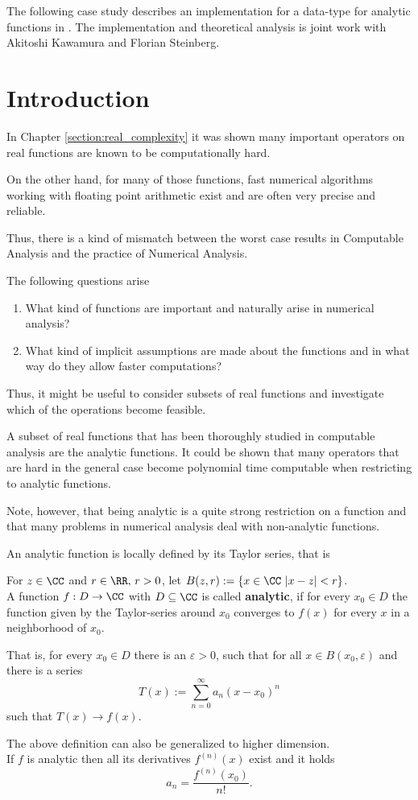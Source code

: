  The following case study describes an implementation for a data-type for
  analytic functions in \irram.
  The implementation and theoretical analysis is joint work with Akitoshi Kawamura and Florian
  Steinberg.
	\section{Introduction}
		In Chapter \ref{section:real_complexity} it was shown many important operators 
		on real functions are known to be computationally hard.

		On the other hand, for many of those functions, fast numerical algorithms working with 
    floating point arithmetic exist and are often very precise and reliable.

    Thus, there is a kind of mismatch between the worst case results in Computable Analysis
    and the practice of Numerical Analysis. 

    The following questions arise
		\begin{enumerate}
			\item What kind of functions are important and naturally arise in numerical analysis? 
			\item What kind of implicit assumptions are made about the functions and in what way do they allow faster computations? 
		\end{enumerate}

    Thus, it might be useful to consider subsets of real functions and investigate which of the operations become feasible.

		A subset of real functions that has been thoroughly studied in computable analysis are the analytic functions.
    It could be shown that many operators that are hard in the general case become polynomial time computable when restricting 
    to analytic functions.
     
    Note, however, that being analytic is a quite strong restriction on a function and that many problems in 
    numerical analysis deal with non-analytic functions.

    An analytic function is locally defined by its Taylor series, that is
		\begin{definition}
			For $z \in \CC$ and $r \in \RR, \, r > 0$, let $B(z,r) := \{ x \in \CC \,\, | x - z | < r\}$. \\
			A function $f: D \to \CC$ with $D \subseteq \CC$ is called \textbf{analytic}, if for every $x_0 \in D$ 
			the function given by the Taylor-series around $x_0$ converges to $f(x)$ for every $x$ in a neighborhood of 
			$x_0$. 

			That is, for every $x_0 \in D$ there is an $\varepsilon > 0$, such that for all $x \in B(x_0, \varepsilon)$ and there is a series
			$$ T(x) := \sum_{n=0}^{\infty} a_n(x-x_0)^n$$
			such that $T(x) \rightarrow f(x)$.

		\end{definition}
		The above definition can also be generalized to higher dimension. \\
		If $f$ is analytic then all its derivatives $f^{(n)}(x)$ exist and it holds
		$$ a_n = \frac{f^{(n)}(x_0)}{n!}. $$    

